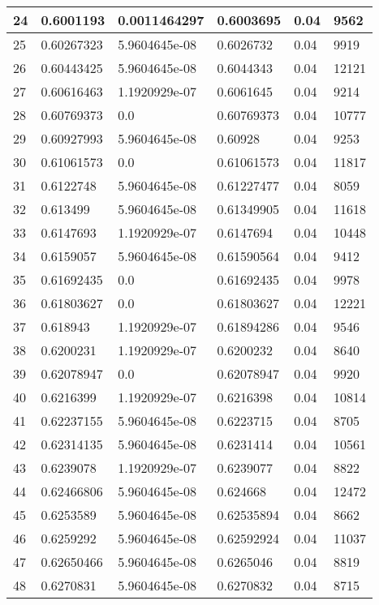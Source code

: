 \begin{longtable}{|l|l|l|l|l|l|}
24 & 0.6001193 & 0.0011464297 & 0.6003695 & 0.04 & 9562 \\ \hline 
25 & 0.60267323 & 5.9604645e-08 & 0.6026732 & 0.04 & 9919 \\ \hline 
26 & 0.60443425 & 5.9604645e-08 & 0.6044343 & 0.04 & 12121 \\ \hline 
27 & 0.60616463 & 1.1920929e-07 & 0.6061645 & 0.04 & 9214 \\ \hline 
28 & 0.60769373 & 0.0 & 0.60769373 & 0.04 & 10777 \\ \hline 
29 & 0.60927993 & 5.9604645e-08 & 0.60928 & 0.04 & 9253 \\ \hline 
30 & 0.61061573 & 0.0 & 0.61061573 & 0.04 & 11817 \\ \hline 
31 & 0.6122748 & 5.9604645e-08 & 0.61227477 & 0.04 & 8059 \\ \hline 
32 & 0.613499 & 5.9604645e-08 & 0.61349905 & 0.04 & 11618 \\ \hline 
33 & 0.6147693 & 1.1920929e-07 & 0.6147694 & 0.04 & 10448 \\ \hline 
34 & 0.6159057 & 5.9604645e-08 & 0.61590564 & 0.04 & 9412 \\ \hline 
35 & 0.61692435 & 0.0 & 0.61692435 & 0.04 & 9978 \\ \hline 
36 & 0.61803627 & 0.0 & 0.61803627 & 0.04 & 12221 \\ \hline 
37 & 0.618943 & 1.1920929e-07 & 0.61894286 & 0.04 & 9546 \\ \hline 
38 & 0.6200231 & 1.1920929e-07 & 0.6200232 & 0.04 & 8640 \\ \hline 
39 & 0.62078947 & 0.0 & 0.62078947 & 0.04 & 9920 \\ \hline 
40 & 0.6216399 & 1.1920929e-07 & 0.6216398 & 0.04 & 10814 \\ \hline 
41 & 0.62237155 & 5.9604645e-08 & 0.6223715 & 0.04 & 8705 \\ \hline 
42 & 0.62314135 & 5.9604645e-08 & 0.6231414 & 0.04 & 10561 \\ \hline 
43 & 0.6239078 & 1.1920929e-07 & 0.6239077 & 0.04 & 8822 \\ \hline 
44 & 0.62466806 & 5.9604645e-08 & 0.624668 & 0.04 & 12472 \\ \hline 
45 & 0.6253589 & 5.9604645e-08 & 0.62535894 & 0.04 & 8662 \\ \hline 
46 & 0.6259292 & 5.9604645e-08 & 0.62592924 & 0.04 & 11037 \\ \hline 
47 & 0.62650466 & 5.9604645e-08 & 0.6265046 & 0.04 & 8819 \\ \hline 
48 & 0.6270831 & 5.9604645e-08 & 0.6270832 & 0.04 & 8715 \\ \hline 

\end{longtable}
